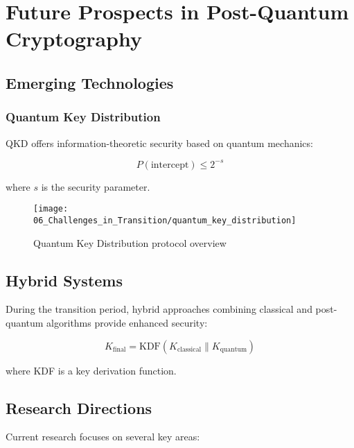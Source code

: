 \chapter{Future Prospects in Post-Quantum Cryptography}\label{chap:future_prospects}

\section{Emerging Technologies}\label{sec:emerging_tech}

\subsection{Quantum Key Distribution}\label{subsec:qkd}
QKD offers information-theoretic security based on quantum mechanics:

\begin{equation}\label{eq:qkd_security}
    P(\text{intercept}) \leq 2^{-s}
\end{equation}

where $s$ is the security parameter.

\begin{figure}[h]
    \centering
    \texttt{[image: 06\_Challenges\_in\_Transition/quantum\_key\_distribution]}
    \caption{Quantum Key Distribution protocol overview}
    \label{fig:qkd_overview}
\end{figure}

\section{Hybrid Systems}\label{sec:hybrid}

During the transition period, hybrid approaches combining classical and post-quantum algorithms provide enhanced security:

\begin{equation}\label{eq:hybrid_security}
    K_{\text{final}} = \text{KDF}(K_{\text{classical}} \| K_{\text{quantum}})
\end{equation}

where KDF is a key derivation function.

\section{Research Directions}\label{sec:research}

Current research focuses on several key areas:

